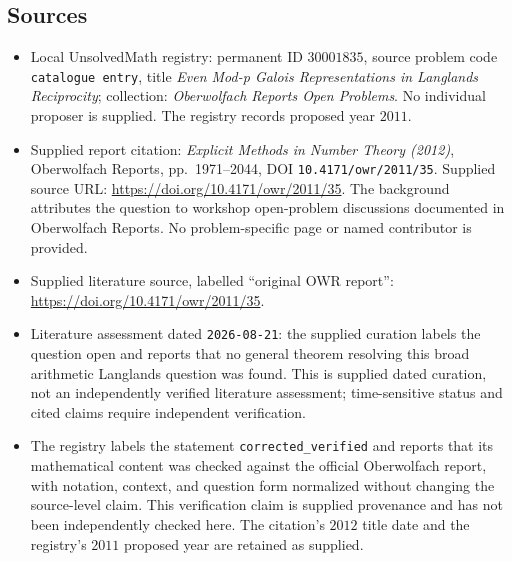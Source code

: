 \documentclass[11pt]{article}
\begin{document}
\subsection{Sources}
\begin{itemize}
\item Local UnsolvedMath registry: permanent ID \(30001835\), source problem code \texttt{catalogue entry}, title \emph{Even Mod-p Galois Representations in Langlands Reciprocity}; collection: \emph{Oberwolfach Reports Open Problems}. No individual proposer is supplied. The registry records proposed year \(2011\).
\item Supplied report citation: \emph{Explicit Methods in Number Theory (2012)}, Oberwolfach Reports, pp.~1971--2044, DOI \texttt{10.4171/owr/2011/35}. Supplied source URL: \url{https://doi.org/10.4171/owr/2011/35}. The background attributes the question to workshop open-problem discussions documented in Oberwolfach Reports. No problem-specific page or named contributor is provided.
\item Supplied literature source, labelled ``original OWR report'': \url{https://doi.org/10.4171/owr/2011/35}.
\item Literature assessment dated \texttt{2026-08-21}: the supplied curation labels the question open and reports that no general theorem resolving this broad arithmetic Langlands question was found. This is supplied dated curation, not an independently verified literature assessment; time-sensitive status and cited claims require independent verification.
\item The registry labels the statement \texttt{corrected\_verified} and reports that its mathematical content was checked against the official Oberwolfach report, with notation, context, and question form normalized without changing the source-level claim. This verification claim is supplied provenance and has not been independently checked here. The citation's \(2012\) title date and the registry's \(2011\) proposed year are retained as supplied.
\end{itemize}
\end{document}
